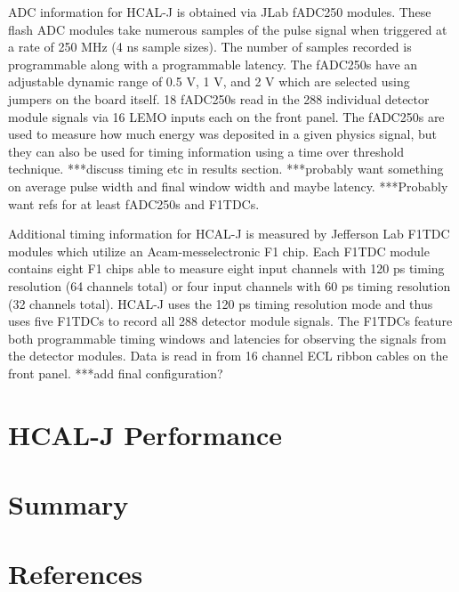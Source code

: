 \documentclass[review]{elsarticle}
\newcommand{\hcal}{HCAL-J }
\newcommand{\jlab}{Jefferson Lab }
\begin{document}
ADC information for \hcal is obtained via JLab fADC250 modules. These flash ADC modules take numerous samples of the pulse signal when triggered at a rate of 250 MHz (4 ns sample sizes). The number of samples recorded is programmable along with a programmable latency. The fADC250s have an adjustable dynamic range of 0.5 V, 1 V, and 2 V which are selected using jumpers on the board itself. 18 fADC250s read in the 288 individual detector module signals via 16 LEMO inputs each on the front panel. The fADC250s are used to measure how much energy was deposited in a given physics signal, but they can also be used for timing information using a time over threshold technique. ***discuss timing etc in results section. ***probably want something on average pulse width and final window width and maybe latency. ***Probably want refs for at least fADC250s and F1TDCs.

Additional timing information for \hcal is measured by \jlab F1TDC modules which utilize an Acam-messelectronic F1 chip. Each F1TDC module contains eight F1 chips able to measure eight input channels with 120 ps timing resolution (64 channels total) or four input channels with 60 ps timing resolution (32 channels total). \hcal uses the 120 ps timing resolution mode and thus uses five F1TDCs to record all 288 detector module signals. The F1TDCs feature both programmable timing windows and latencies for observing the signals from the detector modules. Data is read in from 16 channel ECL ribbon cables on the front panel.  ***add final configuration?

\section{\hcal Performance}
\label{results}

\section{Summary}
\label{summary}

\section*{References}
\label{refs}


\end{document}
